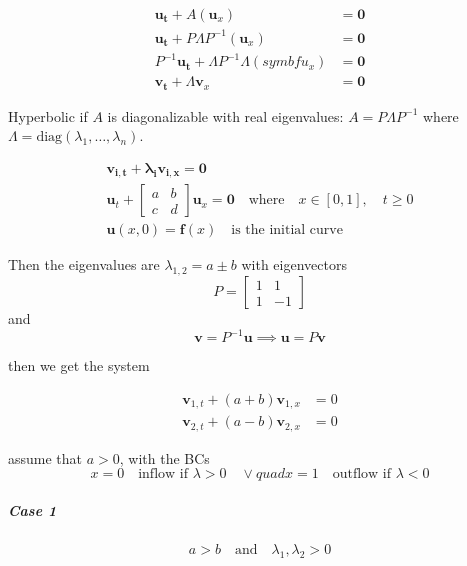 \begin{align*}
  \symbf{u_t} + A(\symbf{u}_x)                           & = \symbf{0} \\
  \symbf{u_t} + P\Lambda P^{-1}(\symbf{u}_x)             & = \symbf{0} \\
  P^{-1}\symbf{u_t} + \Lambda P^{-1}\Lambda(symbf{u}_x) & = \symbf{0} \\
  \symbf{v_t} + \Lambda \symbf{v}_x                      & = \symbf{0}
\end{align*}

Hyperbolic if \(A\) is diagonalizable with real eigenvalues: \(A = P\Lambda P^{-1}\) where \(\Lambda = \text{diag}(\lambda_1, \ldots, \lambda_n)\).

\begin{example}{}{}
  \begin{align*}
    \symbf{v_{i,t} + \lambda_i v_{i,x} = 0}                                  \\
    \symbf{u}_t +
    \begin{bmatrix}
      a & b \\
      c & d
    \end{bmatrix}
    \symbf{u}_x = \symbf{0} \quad \text{where} \quad x\in [0,1], \quad t \geq 0 \\
    \symbf{u}(x,0) = \symbf{f}(x) \quad \text{is the initial curve}
  \end{align*}

  Then the eigenvalues are \(\lambda_{1,2} = a \pm b\) with eigenvectors
  \[
    P = \begin{bmatrix}
      1 & 1  \\
      1 & -1
    \end{bmatrix}
  \]
  and
  \[
    \symbf{v} = P^{-1}\symbf{u} \implies \symbf{u} = P\symbf{v}
  \]

  then we get the system

  \begin{align*}
    \symbf{v}_{1,t} + (a + b)\symbf{v}_{1,x} & = 0 \\
    \symbf{v}_{2,t} + (a - b)\symbf{v}_{2,x} & = 0
  \end{align*}

  assume that \(a > 0\), with the BCs
  \[
    x=0 \quad \text{inflow if } \lambda > 0 \quad \vee quad x = 1 \quad \text{outflow if } \lambda < 0
  \]

  \subparagraph{Case 1}
  \[
    a > b \quad \text{and} \quad \lambda_1, \lambda_2 > 0
  \]



\end{example}


